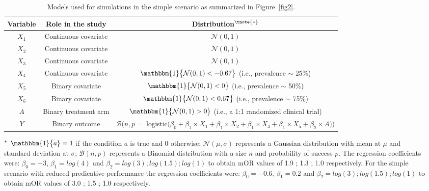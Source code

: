 \documentclass{article}
\begin{document}
\begin{center}
\begin{table}[!ht]%
\scriptsize
\caption{Models used for simulations in the simple scenario as summarized in Figure~\ref{fig2}.\label{tabS2}}
\begin{tabular*}{\textwidth}{@{\extracolsep\fill}ccc@{}}
\toprule
\textbf{Variable} &  \textbf{Role in the study}  & \textbf{Distribution}$^{\tnote{\bf *}}$   \\ \hline
$X_1$  & Continuous   covariate  & $\mathcal{N} (0,1)$           \\
$X_2$  & Continuous    covariate &      $\mathcal{N} (0,1)$                \\
$X_3$   & Continuous  covariate  &      $\mathcal{N} (0,1)$              \\
$X_4$  & Continuous   covariate &     $\mathbbm{1} \big \{ \mathcal{N} (0,1)< -0.67 \big \}$  (i.e., prevalence $\sim$ 25\%)                    \\
$X_5$  & Binary   covariate  &       $\mathbbm{1} \big \{ \mathcal{N} (0,1)< 0 \big \}$  (i.e., prevalence $\sim$ 50\%)         \\
$X_6$  & Binary   covariate  &     $\mathbbm{1} \big \{ \mathcal{N} (0,1)< 0.67 \big \}$  (i.e., prevalence $\sim$ 75\%)       \\  \hline
$A$ & Binary treatment arm   &    $\mathbbm{1} \big \{ \mathcal{N} (0,1)> 0 \big \}$  (i.e., a 1:1 randomized clinical trial)    \\ \hline 
$Y$ &  Binary outcome & $\mathcal{B} \big ( n, p = $ logistic$ \big(  \beta_0 + \beta_1  \times X_1 + \beta_1  \times X_2 + \beta_1  \times X_4 + \beta_1  \times X_5 +   \beta_2 \times A    \big )  \big )$   \\
\bottomrule
\end{tabular*}
\begin{tablenotes}%
\item[$^{\rm *}$] $\mathbbm{1} \big \{  a \} = 1$ if the condition $a$ is true and 0 otherwise;  $\mathcal{N} (\mu,\sigma)$ represents a Gaussian distribution with mean at $\mu$ and standard deviation at $\sigma$; $\mathcal{B} (n,p)$ represents a Binomial distribution with a size $n$ and probability of success  $p$.  The regression coefficients were: $\beta_0 = -3 $,   $\beta_1 = log(4)$  and $\beta_2 = log(3) ; log(1.5) ; log(1)$ to obtain mOR values of 1.9 ; 1.3 ; 1.0 respectively. For the simple scenario with reduced predicative performance the regression coefficients were: $\beta_0 = -0.6 $,   $\beta_1 = 0.2$  and $\beta_2 = log(3) ; log(1.5) ; log(1)$ to obtain mOR values of 3.0 ; 1.5 ; 1.0 respectively.
\end{tablenotes}
\end{table}
\end{center}
\end{document}

